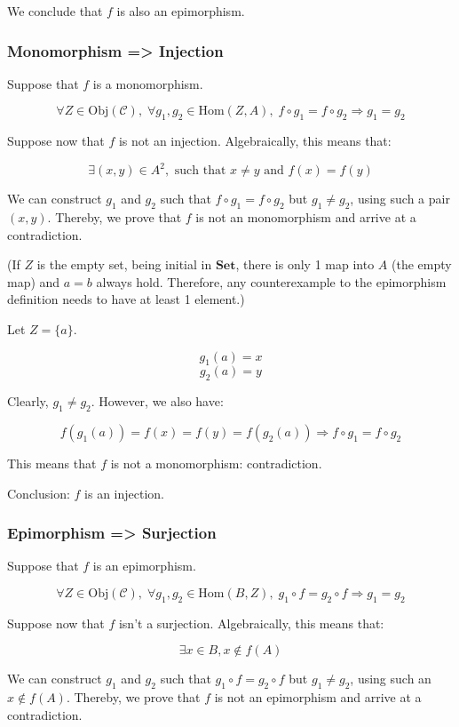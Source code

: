 \documentclass[12pt, letterpaper, twoside]{report}
\begin{document}
We conclude that $f$ is also an epimorphism.


\subsubsection*{Monomorphism => Injection}

Suppose that $f$ is a monomorphism.

$$
\forall Z \in \text{Obj}(\mathcal{C}), \;
\forall g_1, g_2 \in \text{Hom}(Z, A), \;
f \circ g_1 = f \circ g_2 \Rightarrow g_1 = g_2
$$

Suppose now that $f$ is not an injection. Algebraically, this means that:

$$\exists (x, y) \in A^2, \text{ such that } x \neq y \text{ and } f(x) = f(y)$$

We can construct $g_1$ and $g_2$ such that $f \circ g_1 = f \circ g_2$ but $g_1 \neq g_2$, using such a pair $(x, y)$. Thereby, we prove that $f$ is not an monomorphism and arrive at a contradiction.

(If $Z$ is the empty set, being initial in $\mathbf{Set}$, there is only 1 map into $A$ (the empty map) and $a = b$ always hold. Therefore, any counterexample to the epimorphism definition needs to have at least 1 element.)

Let $Z = \{a\}$.

$$g_1(a) = x$$
$$g_2(a) = y$$

Clearly, $g_1 \neq g_2$. However, we also have:

$$
f(g_1(a)) = f(x) = f(y) = f(g_2(a)) \Rightarrow
f \circ g_1 = f \circ g_2
$$

This means that $f$ is not a monomorphism: contradiction.

Conclusion: $f$ is an injection.


\subsubsection*{Epimorphism => Surjection}

Suppose that $f$ is an epimorphism.

$$
\forall Z \in \text{Obj}(\mathcal{C}), \;
\forall g_1, g_2 \in \text{Hom}(B, Z), \;
g_1 \circ f = g_2 \circ f \Rightarrow g_1 = g_2
$$

Suppose now that $f$ isn't a surjection. Algebraically, this means that:

$$\exists x \in B, x \notin f(A)$$

We can construct $g_1$ and $g_2$ such that $g_1 \circ f = g_2 \circ f$ but $g_1 \neq g_2$, using such an $x \notin f(A)$. Thereby, we prove that $f$ is not an epimorphism and arrive at a contradiction.
\end{document}
